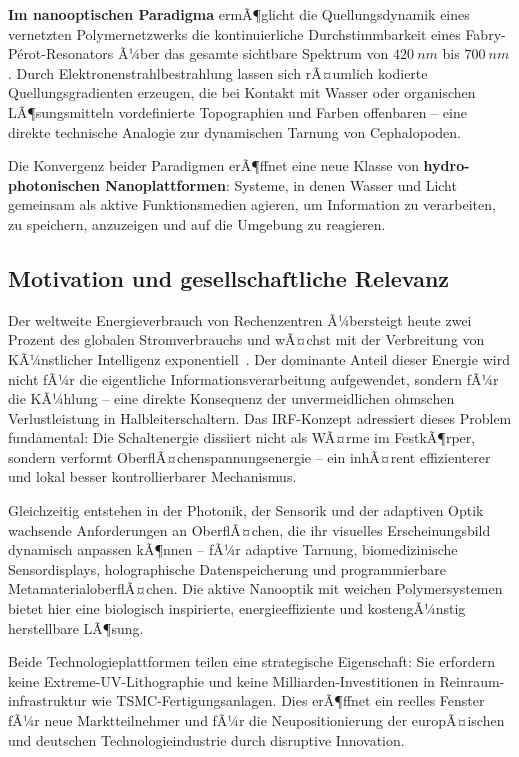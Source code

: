 ﻿\documentclass[a4paper,12pt]{scrreprt}
\theoremstyle{definition}
\begin{document}
\textbf{Im nanooptischen Paradigma} ermÃ¶glicht die Quellungsdynamik eines
vernetzten Polymernetzwerks die kontinuierliche Durchstimmbarkeit eines
Fabry-P{\'e}rot-Resonators Ã¼ber das gesamte sichtbare Spektrum von
$\SI{420}{nm}$ bis $\SI{700}{nm}$. Durch Elektronenstrahlbestrahlung lassen
sich rÃ¤umlich kodierte Quellungsgradienten erzeugen, die bei Kontakt mit
Wasser oder organischen LÃ¶sungsmitteln vordefinierte Topographien und
Farben offenbaren -- eine direkte technische Analogie zur dynamischen
Tarnung von Cephalopoden.

Die Konvergenz beider Paradigmen erÃ¶ffnet eine neue Klasse von
\textbf{hydro-photonischen Nanoplattformen}: Systeme, in denen Wasser und
Licht gemeinsam als aktive Funktionsmedien agieren, um Information zu
verarbeiten, zu speichern, anzuzeigen und auf die Umgebung zu reagieren.

\subsection{Motivation und gesellschaftliche Relevanz}

Der weltweite Energieverbrauch von Rechenzentren Ã¼bersteigt heute zwei Prozent
des globalen Stromverbrauchs und wÃ¤chst mit der Verbreitung von KÃ¼nstlicher
Intelligenz exponentiell~\cite{iea2023}. Der dominante Anteil dieser Energie
wird nicht fÃ¼r die eigentliche Informationsverarbeitung aufgewendet, sondern
fÃ¼r die KÃ¼hlung -- eine direkte Konsequenz der unvermeidlichen ohmschen
Verlustleistung in Halbleiterschaltern. Das IRF-Konzept adressiert dieses
Problem fundamental: Die Schaltenergie dissiiert nicht als WÃ¤rme im FestkÃ¶rper,
sondern verformt OberflÃ¤chenspannungsenergie -- ein inhÃ¤rent effizienterer
und lokal besser kontrollierbarer Mechanismus.

Gleichzeitig entstehen in der Photonik, der Sensorik und der adaptiven Optik
wachsende Anforderungen an OberflÃ¤chen, die ihr visuelles Erscheinungsbild
dynamisch anpassen kÃ¶nnen -- fÃ¼r adaptive Tarnung, biomedizinische
Sensordisplays, holographische Datenspeicherung und programmierbare
MetamaterialoberflÃ¤chen. Die aktive Nanooptik mit weichen Polymersystemen
bietet hier eine biologisch inspirierte, energieeffiziente und kostengÃ¼nstig
herstellbare LÃ¶sung.

Beide Technologieplattformen teilen eine strategische Eigenschaft: Sie erfordern
keine Extreme-UV-Lithographie und keine Milliarden-Investitionen in Reinraum-
infrastruktur wie TSMC-Fertigungsanlagen. Dies erÃ¶ffnet ein reelles Fenster fÃ¼r
neue Marktteilnehmer und fÃ¼r die Neupositionierung der europÃ¤ischen und deutschen
Technologieindustrie durch disruptive Innovation.
\end{document}
